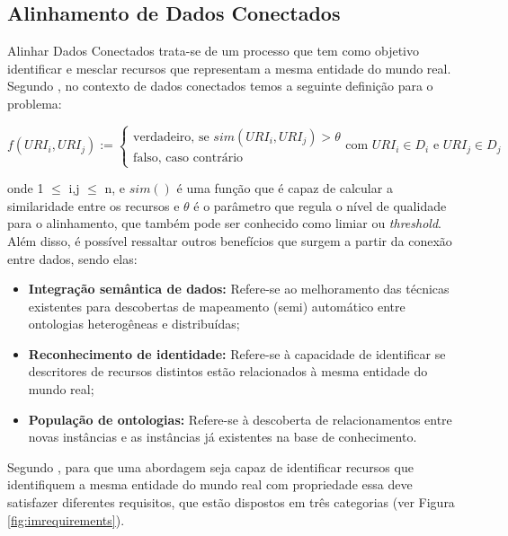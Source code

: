 \subsection{Alinhamento de Dados Conectados}

Alinhar Dados Conectados  trata-se de um processo que tem como objetivo identificar e mesclar recursos que representam a mesma entidade do mundo real. Segundo , no contexto de dados conectados temos a seguinte definição para o problema:

\begin{equation}
f\left( { URI }_{ i },{ URI }_{ j } \right) :=\begin{cases} \mbox{verdadeiro, se } sim\left( { URI }_{ i },{ URI }_{ j } \right) >\theta  \\ \mbox{falso, caso contrário} \end{cases}\mbox{com }{ URI }_{ i } \in { D }_{ i }\mbox{ e }{ URI }_{ j } \in { D }_{ j }
\end{equation}

onde 1 $\leq$ i,j $\leq$ n, e $sim()$ é uma função que é capaz de calcular a similaridade entre os recursos e $\theta$ é o parâmetro que regula o nível de qualidade para o alinhamento, que também pode ser conhecido como limiar ou \textit{threshold}. Além disso, é possível ressaltar outros benefícios que surgem a partir da conexão entre dados, sendo elas: 

\begin{itemize}
	\item \textbf{Integração semântica de dados:} Refere-se ao melhoramento das técnicas existentes para descobertas de mapeamento (semi) automático entre ontologias heterogêneas e distribuídas; 
	\item \textbf{Reconhecimento de identidade:} Refere-se à capacidade de identificar se descritores de recursos distintos estão relacionados à mesma entidade do mundo real; 
	\item\textbf{ População de ontologias:} Refere-se à descoberta de relacionamentos entre novas instâncias e as instâncias já existentes na base de conhecimento. 
\end{itemize}

Segundo , para que uma abordagem seja capaz de identificar recursos que identifiquem a mesma entidade do mundo real com propriedade essa deve satisfazer diferentes requisitos, que estão  dispostos em três categorias (ver Figura \ref{fig:imrequirements}).


